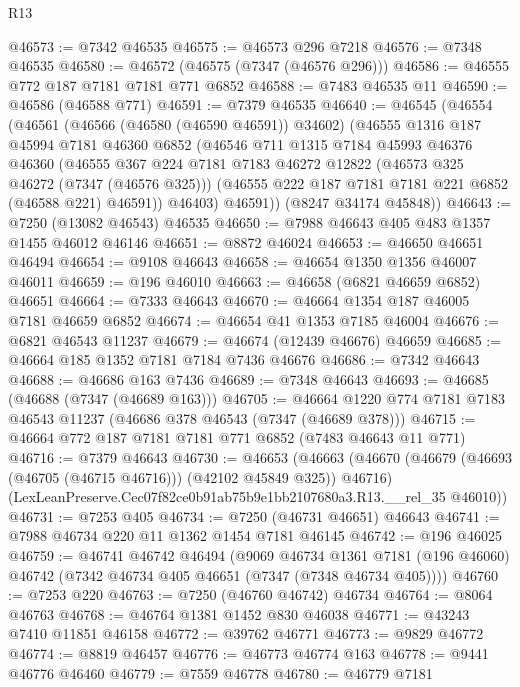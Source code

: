 \begin{lexlean}{R13}
\begin{coremodule}
@46573 := @7342 @46535
@46575 := @46573 @296 @7218
@46576 := @7348 @46535
@46580 := @46572 (@46575 (@7347 (@46576 @296)))
@46586 := @46555 @772 @187 @7181 @7181 @771 @6852
@46588 := @7483 @46535 @11
@46590 := @46586 (@46588 @771)
@46591 := @7379 @46535
@46640 := @46545
    (@46554
      (@46561
        (@46566 (@46580 (@46590 @46591)) @34602)
        (@46555
          @1316
          @187
          @45994
          @7181
          @46360
          @6852
          (@46546
            @711
            @1315
            @7184
            @45993
            @46376
            @46360
            (@46555
              @367
              @224
              @7181
              @7183
              @46272
              @12822
              (@46573 @325 @46272 (@7347 (@46576 @325)))
              (@46555 @222 @187 @7181 @7181 @221 @6852 (@46588 @221) @46591))
            @46403)
          @46591))
      (@8247 @34174 @45848))
@46643 := @7250 (@13082 @46543) @46535
@46650 := @7988 @46643 @405 @483 @1357 @1455 @46012 @46146
@46651 := @8872 @46024
@46653 := @46650 @46651 @46494
@46654 := @9108 @46643
@46658 := @46654 @1350 @1356 @46007 @46011
@46659 := @196 @46010
@46663 := @46658 (@6821 @46659 @6852) @46651
@46664 := @7333 @46643
@46670 := @46664 @1354 @187 @46005 @7181 @46659 @6852
@46674 := @46654 @41 @1353 @7185 @46004
@46676 := @6821 @46543 @11237
@46679 := @46674 (@12439 @46676) @46659
@46685 := @46664 @185 @1352 @7181 @7184 @7436 @46676
@46686 := @7342 @46643
@46688 := @46686 @163 @7436
@46689 := @7348 @46643
@46693 := @46685 (@46688 (@7347 (@46689 @163)))
@46705 := @46664 @1220 @774 @7181 @7183 @46543 @11237 (@46686 @378 @46543 (@7347 (@46689 @378)))
@46715 := @46664 @772 @187 @7181 @7181 @771 @6852 (@7483 @46643 @11 @771)
@46716 := @7379 @46643
@46730 := @46653
    (@46663
      (@46670 (@46679 (@46693 (@46705 (@46715 @46716))) (@42102 @45849 @325)) @46716)
      (LexLeanPreserve.Cec07f82ce0b91ab75b9e1bb2107680a3.R13.__rel_35 @46010))
@46731 := @7253 @405
@46734 := @7250 (@46731 @46651) @46643
@46741 := @7988 @46734 @220 @11 @1362 @1454 @7181 @46145
@46742 := @196 @46025
@46759 := @46741
    @46742
    @46494
    (@9069
      @46734
      @1361
      @7181
      (@196 @46060)
      @46742
      (@7342 @46734 @405 @46651 (@7347 (@7348 @46734 @405))))
@46760 := @7253 @220
@46763 := @7250 (@46760 @46742) @46734
@46764 := @8064 @46763
@46768 := @46764 @1381 @1452 @830 @46038
@46771 := @43243 @7410 @11851 @46158
@46772 := @39762 @46771
@46773 := @9829 @46772
@46774 := @8819 @46457
@46776 := @46773 @46774 @163
@46778 := @9441 @46776 @46460
@46779 := @7559 @46778
@46780 := @46779 @7181

\end{coremodule}
\end{lexlean}
